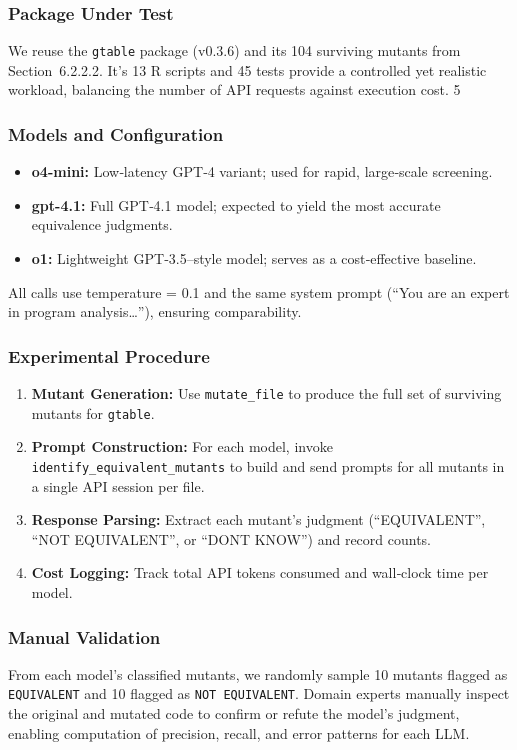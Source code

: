 \subsubsection{Package Under Test}
We reuse the \texttt{gtable} package (v0.3.6) and its 104 surviving mutants from Section~6.2.2.2.  It's 13 R scripts and 45 tests provide a controlled yet realistic workload, balancing the number of API requests against execution cost.
5
\subsubsection{Models and Configuration}
\begin{itemize}
  \item \textbf{o4-mini:} Low‐latency GPT‐4 variant; used for rapid, large‐scale screening.
  \item \textbf{gpt-4.1:} Full GPT‐4.1 model; expected to yield the most accurate equivalence judgments.
  \item \textbf{o1:} Lightweight GPT‐3.5–style model; serves as a cost‐effective baseline.
\end{itemize}
All calls use temperature = 0.1 and the same system prompt (“You are an expert in program analysis…”), ensuring comparability.

\subsubsection{Experimental Procedure}
\begin{enumerate}
  \item \textbf{Mutant Generation:} Use \texttt{mutate\_file} to produce the full set of surviving mutants for \texttt{gtable}.  
  \item \textbf{Prompt Construction:} For each model, invoke \texttt{identify\_equivalent\_mutants} to build and send prompts for all mutants in a single API session per file.  
  \item \textbf{Response Parsing:} Extract each mutant’s judgment (“EQUIVALENT”, “NOT EQUIVALENT”, or “DONT KNOW”) and record counts.  
  \item \textbf{Cost Logging:} Track total API tokens consumed and wall‐clock time per model.
\end{enumerate}

\subsubsection{Manual Validation}
From each model’s classified mutants, we randomly sample 10 mutants flagged as \texttt{EQUIVALENT} and 10 flagged as \texttt{NOT EQUIVALENT}.  Domain experts manually inspect the original and mutated code to confirm or refute the model’s judgment, enabling computation of precision, recall, and error patterns for each LLM.


